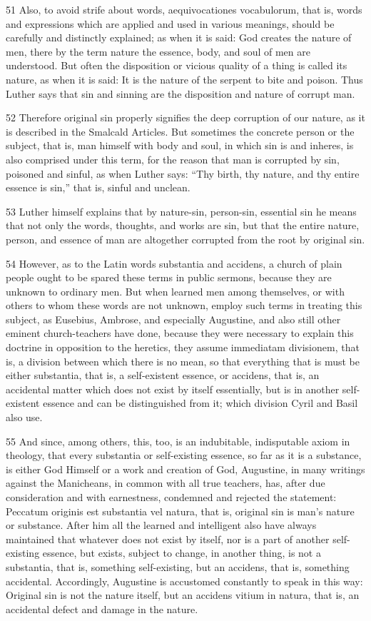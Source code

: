 51 Also, to avoid strife about words, aequivocationes vocabulorum, that is, words and expressions which are applied and used in various meanings, should be carefully and distinctly explained; as when it is said: God creates the nature of men, there by the term nature the essence, body, and soul of men are understood. But often the disposition or vicious quality of a thing is called its nature, as when it is said: It is the nature of the serpent to bite and poison. Thus Luther says that sin and sinning are the disposition and nature of corrupt man.

52 Therefore original sin properly signifies the deep corruption of our nature, as it is described in the Smalcald Articles. But sometimes the concrete person or the subject, that is, man himself with body and soul, in which sin is and inheres, is also comprised under this term, for the reason that man is corrupted by sin, poisoned and sinful, as when Luther says: “Thy birth, thy nature, and thy entire essence is sin,” that is, sinful and unclean.

53 Luther himself explains that by nature-sin, person-sin, essential sin he means that not only the words, thoughts, and works are sin, but that the entire nature, person, and essence of man are altogether corrupted from the root by original sin.

54 However, as to the Latin words substantia and accidens, a church of plain people ought to be spared these terms in public sermons, because they are unknown to ordinary men. But when learned men among themselves, or with others to whom these words are not unknown, employ such terms in treating this subject, as Eusebius, Ambrose, and especially Augustine, and also still other eminent church-teachers have done, because they were necessary to explain this doctrine in opposition to the heretics, they assume immediatam divisionem, that is, a division between which there is no mean, so that everything that is must be either substantia, that is, a self-existent essence, or accidens, that is, an accidental matter which does not exist by itself essentially, but is in another self-existent essence and can be distinguished from it; which division Cyril and Basil also use.

55 And since, among others, this, too, is an indubitable, indisputable axiom in theology, that every substantia or self-existing essence, so far as it is a substance, is either God Himself or a work and creation of God, Augustine, in many writings against the Manicheans, in common with all true teachers, has, after due consideration and with earnestness, condemned and rejected the statement: Peccatum originis est substantia vel natura, that is, original sin is man’s nature or substance. After him all the learned and intelligent also have always maintained that whatever does not exist by itself, nor is a part of another self-existing essence, but exists, subject to change, in another thing, is not a substantia, that is, something self-existing, but an accidens, that is, something accidental. Accordingly, Augustine is accustomed constantly to speak in this way: Original sin is not the nature itself, but an accidens vitium in natura, that is, an accidental defect and damage in the nature.

